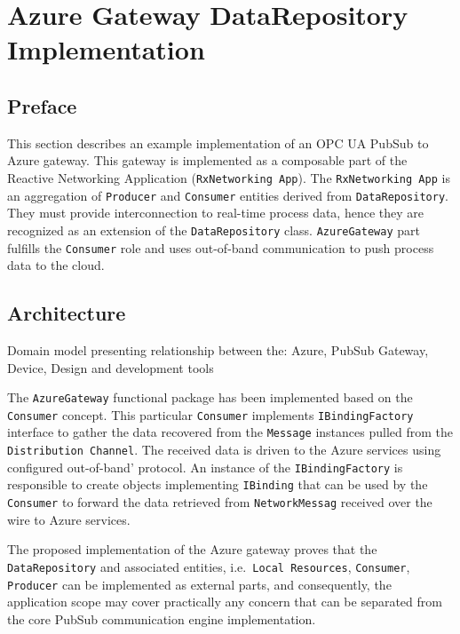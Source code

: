 \documentclass[
]{article}
\date{}
\begin{document}
\hypertarget{azure-gateway-datarepository-implementation}{%
\section{Azure Gateway DataRepository Implementation}\label{azure-gateway-datarepository-implementation}}

\hypertarget{preface}{%
\subsection{Preface}\label{preface}}

This section describes an example implementation of an OPC UA PubSub to Azure gateway. This gateway is implemented as a composable part of the Reactive Networking Application (\texttt{RxNetworking\ App}). The \texttt{RxNetworking\ App} is an aggregation of \texttt{Producer} and \texttt{Consumer} entities derived from \texttt{DataRepository}. They must provide interconnection to real-time process data, hence they are recognized as an extension of the \texttt{DataRepository} class. \texttt{AzureGateway} part fulfills the \texttt{Consumer} role and uses out-of-band communication to push process data to the cloud.

\hypertarget{architecture}{%
\subsection{Architecture}\label{architecture}}

Domain model presenting relationship between the: Azure, PubSub Gateway, Device, Design and development tools

The \texttt{AzureGateway} functional package has been implemented based on the \texttt{Consumer} concept. This particular \texttt{Consumer} implements \texttt{IBindingFactory} interface to gather the data recovered from the \texttt{Message} instances pulled from the \texttt{Distribution\ Channel}. The received data is driven to the Azure services using configured out-of-band' protocol. An instance of the \texttt{IBindingFactory} is responsible to create objects implementing \texttt{IBinding} that can be used by the \texttt{Consumer} to forward the data retrieved from \texttt{NetworkMessag} received over the wire to Azure services.

The proposed implementation of the Azure gateway proves that the \texttt{DataRepository} and associated entities, i.e.~\texttt{Local\ Resources}, \texttt{Consumer}, \texttt{Producer} can be implemented as external parts, and consequently, the application scope may cover practically any concern that can be separated from the core PubSub communication engine implementation.
\end{document}
